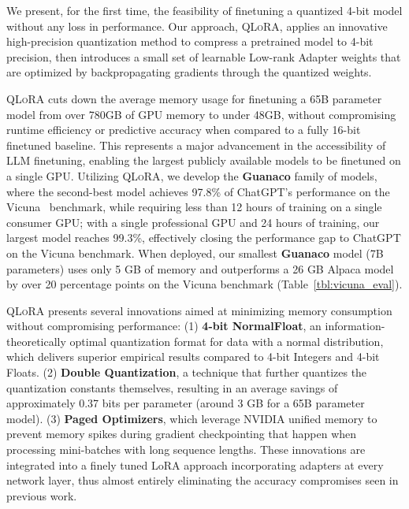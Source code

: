 We present, for the first time, the feasibility of finetuning a quantized 4-bit model without any loss in performance. Our approach, \textsc{QLoRA}, applies an innovative high-precision quantization method to compress a pretrained model to 4-bit precision, then introduces a small set of learnable Low-rank Adapter weights \citep{hu2021lora} that are optimized by backpropagating gradients through the quantized weights. 

\textsc{QLoRA} cuts down the average memory usage for finetuning a 65B parameter model from over 780GB of GPU memory to under 48GB, without compromising runtime efficiency or predictive accuracy when compared to a fully 16-bit finetuned baseline. This represents a major advancement in the accessibility of LLM finetuning, enabling the largest publicly available models to be finetuned on a single GPU. Utilizing \textsc{QLoRA}, we develop the \textbf{Guanaco} family of models, where the second-best model achieves 97.8\% of ChatGPT’s performance on the Vicuna~\citep{vicuna2023} benchmark, while requiring less than 12 hours of training on a single consumer GPU; with a single professional GPU and 24 hours of training, our largest model reaches 99.3\%, effectively closing the performance gap to ChatGPT on the Vicuna benchmark. When deployed, our smallest \textbf{Guanaco} model (7B parameters) uses only 5 GB of memory and outperforms a 26 GB Alpaca model by over 20 percentage points on the Vicuna benchmark (Table~\ref{tbl:vicuna_eval}).

\textsc{QLoRA} presents several innovations aimed at minimizing memory consumption without compromising performance: (1) \textbf{4-bit NormalFloat}, an information-theoretically optimal quantization format for data with a normal distribution, which delivers superior empirical results compared to 4-bit Integers and 4-bit Floats. (2) \textbf{Double Quantization}, a technique that further quantizes the quantization constants themselves, resulting in an average savings of approximately 0.37 bits per parameter (around 3 GB for a 65B parameter model). (3) \textbf{Paged Optimizers}, which leverage NVIDIA unified memory to prevent memory spikes during gradient checkpointing that happen when processing mini-batches with long sequence lengths. These innovations are integrated into a finely tuned LoRA approach incorporating adapters at every network layer, thus almost entirely eliminating the accuracy compromises seen in previous work.

